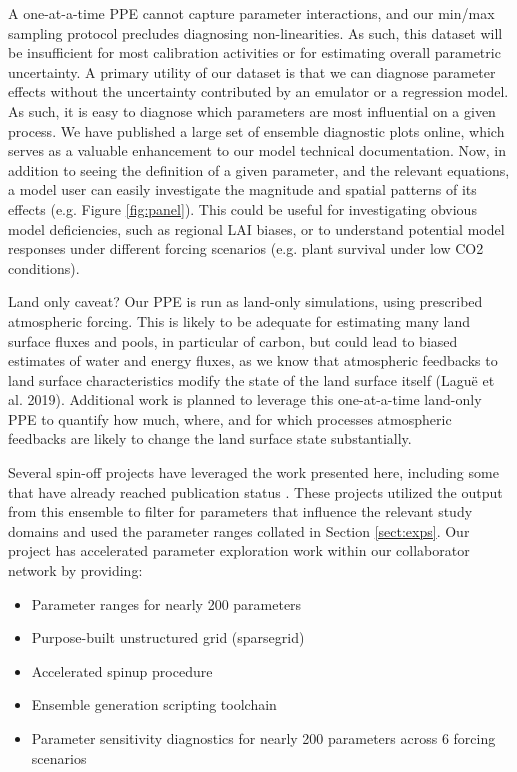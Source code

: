 \documentclass[draft]{agujournal2019}
\begin{document}
A one-at-a-time PPE cannot capture parameter interactions, and our min/max sampling protocol precludes diagnosing non-linearities. As such, this dataset will be insufficient for most calibration activities or for estimating overall parametric uncertainty. A primary utility of our dataset is that we can diagnose parameter effects without the uncertainty contributed by an emulator or a regression model. As such, it is easy to diagnose which parameters are most influential on a given process. We have published a large set of ensemble diagnostic plots online, which serves as a valuable enhancement to our model technical documentation. Now, in addition to seeing the definition of a given parameter, and the relevant equations, a model user can easily investigate the magnitude and spatial patterns of its effects (e.g. Figure \ref{fig:panel}). This could be useful for investigating obvious model deficiencies, such as regional LAI biases, or to understand potential model responses under different forcing scenarios (e.g. plant survival under low CO2 conditions).  

Land only caveat? Our PPE is run as land-only simulations, using prescribed atmospheric forcing. This is likely to be adequate for estimating many land surface fluxes and pools, in particular of carbon, but could lead to biased estimates of water and energy fluxes, as we know that atmospheric feedbacks to land surface characteristics modify the state of the land surface itself (Laguë et al. 2019). Additional work is planned to leverage this one-at-a-time land-only PPE to quantify how much, where, and for which processes atmospheric feedbacks are likely to change the land surface state substantially. 

Several spin-off projects have leveraged the work presented here, including some that have already reached publication status \cite{cheng2023,yan2023a,yan2023b}. These projects utilized the output from this ensemble to filter for parameters that influence the relevant study domains and used the parameter ranges collated in Section \ref{sect:exps}. Our project has accelerated parameter exploration work within our collaborator network by providing:

\begin{itemize}
\item Parameter ranges for nearly 200 parameters
\item Purpose-built unstructured grid (sparsegrid)
\item Accelerated spinup procedure
\item Ensemble generation scripting toolchain
\item Parameter sensitivity diagnostics for nearly 200 parameters across 6 forcing scenarios
\end{itemize} 
\end{document}
